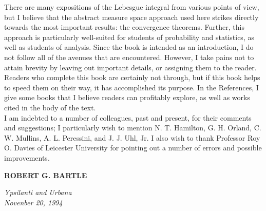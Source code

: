 \indent There are many expositions of the Lebesgue integral from various points of view, but I believe that the abstract measure 
space approach used here strikes directly towards the most important results: the convergence theorems. Further, this approach is 
particularly well-suited for students of probability and statistics, as well as students of analysis. Since the book is intended as 
an introduction, I do not follow all of the avenues that are encountered. However, I take pains not to attain brevity by leaving out 
important details, or assigning them to the reader.\\
\indent Readers who complete this book are certainly not through, but if this book helps to speed them on their way, it has accomplished 
its purpose. In the References, I give some books that I believe readers can profitably explore, as well as works cited in the body of the text.\\
\indent I am indebted to a number of colleagues, past and present, for their comments and suggestions; 
I particularly wish to mention N. T. Hamilton, G. H. Orland, C. W. Mullins, A. L. Peressini, and J. J. Uhl, Jr. I also wish to thank 
Professor Roy O. Davies of Leicester University for pointing out a number of errors and possible improvements.\\


\begin{flushright}\noindent

  \hfill {\bf ROBERT G. BARTLE}\\
\end{flushright}
\textit{Ypsilanti and Urbana} \\ \textit{Novenber 20, 1994}\\
